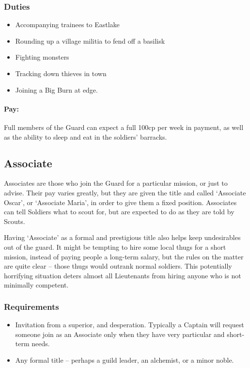 \begin{multicols}{2}
\begin{itemize}
\end{itemize}

\subsubsection{Duties}

\begin{itemize}
  \item
  Accompanying trainees to Eastlake
  \item
  Rounding up a village militia to fend off a basilisk
  \item
  Fighting monsters
  \item
  Tracking down thieves in town
  \item
  Joining a Big Burn at \gls{edge}.
\end{itemize}

\paragraph{Pay:}
Full members of the Guard can expect a full 100cp per week in payment, as well as the ability to sleep and eat in the soldiers' barracks.

\subsection{Associate}
\label{ngAssociate}

Associates are those who join the Guard for a particular mission, or just to advise.
Their pay varies greatly, but they are given the title and called `Associate Oscar', or `Associate Maria', in order to give them a fixed position.
Associates can tell Soldiers what to scout for, but are expected to do as they are told by Scouts.

Having `Associate' as a formal and prestigious title also helps keep undesirables out of the \gls{guard}.
It might be tempting to hire some local thugs for a short mission, instead of paying people a long-term salary, but the rules on the matter are quite clear -- those thugs would outrank normal soldiers.
This potentially horrifying situation deters almost all Lieutenants from hiring anyone who is not minimally competent.

\subsubsection{Requirements}

\begin{itemize}
  \item
  Invitation from a superior, and desperation.
  Typically a Captain will request someone join as an Associate only when they have very particular and short-term needs.
  \item
  Any formal title -- perhaps a guild leader, an alchemist, or a minor noble.
\end{itemize}


\end{multicols}

